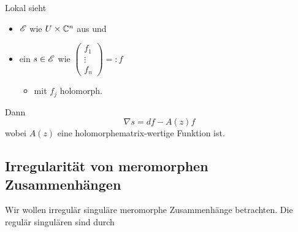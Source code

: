 \begin{rem}
  Lokal sieht
  \begin{itemize}
    \item $\mathscr{E}$ wie $U\times\mathbb{C}^n$ aus und
    \item ein $s\in\mathscr{E}$ wie 
      $\begin{pmatrix}f_{1}\\ \vdots\\ f_{n} \end{pmatrix}=:f$
      \begin{itemize}
        \item mit $f_j$ holomorph.
      \end{itemize}
  \end{itemize}
  Dann
  \[
    \nabla s=df - A(z)f
  \]
  wobei $A(z)$ eine holomorphe\TODO[meromorph?] matrix-wertige Funktion ist.
  \begin{comment}
    Wollen diese Klassifizieren. Klassifiziere diese durch die Lösung von
    $\nabla s=0$. Dies ist eine DGL (ODE).
  \end{comment}
\end{rem}
\begin{comment}
  \TODO[$A^0=\dots$]
  \begin{defn}
    \begin{itemize}
      \item $G\{z\}:=\GL_n(\C\{z\})$ \emph{locale analytischen Gauge
        Tranformationen}
        \begin{itemize}
          \item mit Wirkung $F[A^0]=(dF)F^{-1}+FA^0F^{-1}$
            \marginnote{see \cite{sabbah2007isomonodromic} II.2.a}
        \end{itemize}
      \item $\hat G:=\GL_n(\C\llbracket z\rrbracket)$ \emph{formale
        Tranformationen}
    \end{itemize}
    definiere
    \[
      \Syst(A^0)
      :=\left\{A \mid A=\hat F[A^0]\text{ für ein }\hat F\in\hat G\right\}
    \]
  \end{defn}
  \begin{center}
    \textbf{Wir sind interessiert in $\Syst(A^0)/G\{z\}$}
  \end{center}
  Wir benötigen aber den etwas größeren Raum
  $\widehat\Syst(A^0)/G\{z\}=:\sH$.
\end{comment}
\subsection{Irregularität von meromorphen Zusammenhängen} %
Wir wollen irregulär singuläre meromorphe Zusammenhänge betrachten. Die regulär
singulären sind durch \TODO

